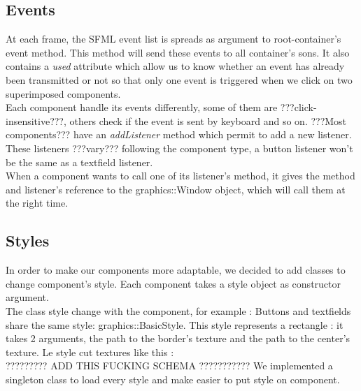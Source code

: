 \documentclass{scrreprt}
\begin{document}
	\subsection{Events}
	At each frame, the SFML event list is spreads as argument to root-container's event method. This method will send these events to all container's sons. It also contains a \emph{used} attribute which allow us to know whether an event has already been transmitted or not so that only one event is triggered when we click on two superimposed components.\\

	Each component handle its events differently, some of them are ???click-insensitive???, others check if the event is sent by keyboard and so on.
	???Most components??? have an \emph{addListener} method which permit to add a new listener. These listeners ???vary??? following the component type, a button listener won't be the same as a textfield listener.\\

	When a component wants to call one of its listener's method, it gives the method and listener's reference to the graphics::Window object, which will call them at the right time.

	\subsection{Styles}
	In order to make our components more adaptable, we decided to add classes to change component's style. Each component takes a style object as constructor argument.\\
	The class style change with the component, for example : Buttons and textfields share the same style: graphics::BasicStyle. This style represents a rectangle : it takes 2 arguments, the path to the border's texture and the path to the center's texture. Le style cut textures like this :\\
	????????? ADD THIS FUCKING SCHEMA ???????????
	We implemented a singleton class to load every style and make easier to put style on component. 
\end{document}
